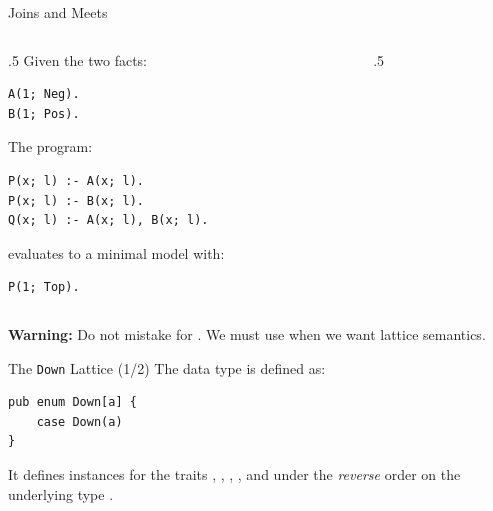 \begin{frame}[fragile]{Joins and Meets}
\begin{columns}
\begin{column}{.5\textwidth}
Given the two facts:

\begin{lstlisting}[language=flix, xleftmargin=0.8cm]
A(1; Neg).
B(1; Pos).
\end{lstlisting}

The program:

\begin{lstlisting}[language=flix, xleftmargin=0.8cm]
P(x; l) :- A(x; l).
P(x; l) :- B(x; l).
Q(x; l) :- A(x; l), B(x; l).
\end{lstlisting}

evaluates to a minimal model with:

\begin{lstlisting}[language=flix, xleftmargin=0.8cm]
P(1; Top).
\end{lstlisting}

\end{column}
\begin{column}{.5\textwidth}
\centering
{}
\end{column}
\end{columns}

\medskip

\pause

{
\small
\textbf{Warning:} Do not mistake \Code{,} for \Code{;}. We must use \Code{;}
when we want lattice semantics. 
}

\end{frame}

\begin{frame}[fragile]{The \texttt{Down} Lattice (1/2)}
The  data type is defined as: 

\begin{lstlisting}[language=flix, xleftmargin=0.8cm]
pub enum Down[a] {
    case Down(a)
}
\end{lstlisting}

It defines instances for the traits , ,
, , and  under the
\emph{reverse} order on the underlying type .
\end{frame}

